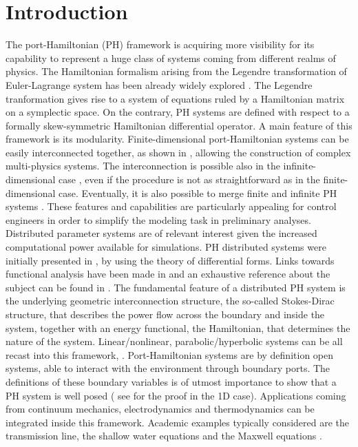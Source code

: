 \documentclass[preprint,12pt]{elsarticle}
\newcommand{\firstReviewer}[1]{\textcolor{red!80!black}{#1}}
\begin{document}
	\section*{Introduction}
	 The port-Hamiltonian (PH) framework is acquiring more visibility for its capability to represent a huge class of systems coming from different realms of physics. \firstReviewer{The Hamiltonian formalism arising from the Legendre transformation of Euler-Lagrange system  has been already widely explored \cite{SymplecticElasticity}. The Legendre tranformation gives rise to a system of equations ruled by a Hamiltonian matrix on a symplectic space. On the contrary,  PH systems are defined with respect to a formally skew-symmetric Hamiltonian differential operator.} A main feature of this framework is its modularity. Finite-dimensional port-Hamiltonian systems can be easily interconnected together, as shown in \cite{Cervera2007}, allowing the construction of complex multi-physics systems. The interconnection is possible also in the infinite-dimensional case \cite{ShaftIntInfinite}, even if the procedure is not as straightforward as in the finite-dimensional case. Eventually, it is also possible to merge finite and infinite PH systems \cite{vanderShaftintFinInf}. These features and capabilities are particularly appealing for control engineers in order to simplify the modeling task in preliminary analyses.  \\
	
	
	Distributed parameter systems are of relevant interest given the increased computational power available for simulations. PH distributed systems were initially presented in \cite{VANDERSCHAFT2002166}, by using the theory of differential forms. Links towards functional analysis have been made in \cite{Villegas} and an exhaustive reference about the subject can be found in \cite{BookZwart}. The fundamental feature of a distributed PH system is the underlying geometric interconnection structure, the so-called Stokes-Dirac structure, that describes the power flow across the boundary and inside the system, together with an energy functional, the Hamiltonian, that determines the nature of the system. Linear/nonlinear, parabolic/hyperbolic systems can be all recast into this framework, \cite{bookPHs}. Port-Hamiltonian systems are by definition open systems, able to interact with the environment through boundary ports. The definitions of these boundary variables is of utmost importance to show that a PH system is well posed ( see \cite{LeGorrec2005} for the proof in the 1D case). Applications coming from continuum mechanics, electrodynamics and thermodynamics can be integrated inside this framework. Academic examples typically considered are the transmission line, the shallow water equations and the Maxwell equations \cite{VANDERSCHAFT2002166}. \\
	
\end{document}
